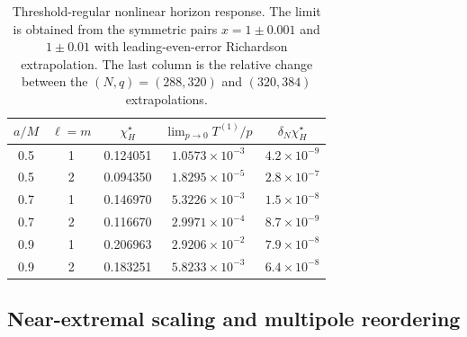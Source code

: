 \documentclass[aps,prd,twocolumn,10pt,nofootinbib,superscriptaddress,floatfix]{revtex4-2}
\begin{document}
\begin{table}[t]
\caption{Threshold-regular nonlinear horizon response.  The limit is obtained
from the symmetric pairs $x=1\pm0.001$ and $1\pm0.01$ with leading-even-error
Richardson extrapolation.  The last column is the relative change between the
$(N,q)=(288,320)$ and $(320,384)$ extrapolations.}
\label{tab:superradiant}
\begin{ruledtabular}
\begin{tabular}{c c c c c}
$a/M$ & $\ell=m$ & $\chi_H^\star$ & $\displaystyle\lim_{p\to0}T^{(1)}/p$ & $\delta_N\chi_H^\star$\\
\hline
0.5 & 1 & 0.124051 & $1.0573\times10^{-3}$ & $4.2\times10^{-9}$\\
0.5 & 2 & 0.094350 & $1.8295\times10^{-5}$ & $2.8\times10^{-7}$\\
0.7 & 1 & 0.146970 & $5.3226\times10^{-3}$ & $1.5\times10^{-8}$\\
0.7 & 2 & 0.116670 & $2.9971\times10^{-4}$ & $8.7\times10^{-9}$\\
0.9 & 1 & 0.206963 & $2.9206\times10^{-2}$ & $7.9\times10^{-8}$\\
0.9 & 2 & 0.183251 & $5.8233\times10^{-3}$ & $6.4\times10^{-8}$\\
\end{tabular}
\end{ruledtabular}
\end{table}

\subsection{Near-extremal scaling and multipole reordering}
\end{document}
